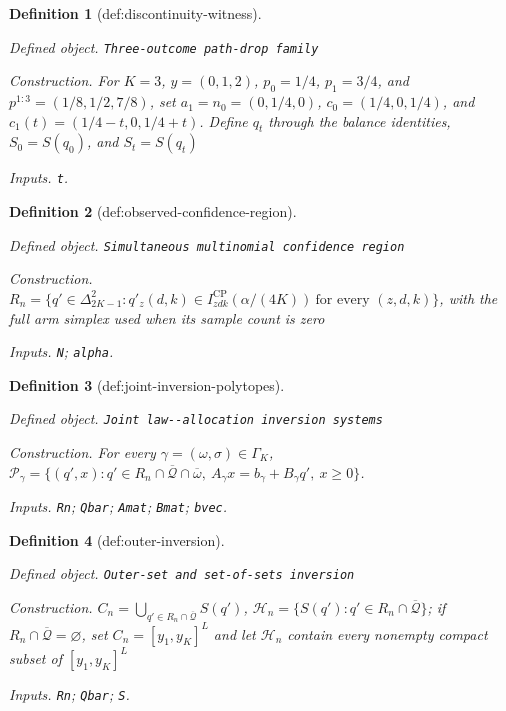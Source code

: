 \documentclass{article}
\newtheorem{definition}{Definition}
\begin{document}
\begin{definition}[def:discontinuity-witness]\label{def:discontinuity-witness}
\par\smallskip\noindent\emph{Defined object.} \texttt{Three-\allowbreak{}outcome path-\allowbreak{}drop family}
\par\smallskip\noindent\emph{Construction.} For \(K=3\), \(y=(0,1,2)\), \(p_0=1/4\), \(p_1=3/4\), and \(p^{1:3}=(1/8,1/2,7/8)\), set \(a_1=n_0=(0,1/4,0)\), \(c_0=(1/4,0,1/4)\), and \(c_1(t)=(1/4-t,0,1/4+t)\). Define \(q_t\) through the balance identities, \(S_0=S(q_0)\), and \(S_t=S(q_t)\)
\par\smallskip\noindent\emph{Inputs.} \texttt{t}.
\end{definition}

\begin{definition}[def:observed-confidence-region]\label{def:observed-confidence-region}
\par\smallskip\noindent\emph{Defined object.} \texttt{Simultaneous multinomial confidence region}
\par\smallskip\noindent\emph{Construction.} \(R_n=\{q'\in\Delta_{2K-1}^2:q'_z(d,k)\in I^{\mathrm{CP}}_{zdk}(\alpha/(4K))\ \text{for every }(z,d,k)\}\), with the full arm simplex used when its sample count is zero
\par\smallskip\noindent\emph{Inputs.} \texttt{N}; \texttt{alpha}.
\end{definition}

\begin{definition}[def:joint-inversion-polytopes]\label{def:joint-inversion-polytopes}
\par\smallskip\noindent\emph{Defined object.} \texttt{Joint law-\allowbreak{}-\allowbreak{}allocation inversion systems}
\par\smallskip\noindent\emph{Construction.} For every \(\gamma=(\omega,\sigma)\in\Gamma_K\), \(\mathcal P_\gamma=\{(q',x):q'\in R_n\cap\overline{\mathcal Q}\cap\overline\omega,\ A_\gamma x=b_\gamma+B_\gamma q',\ x\ge0\}\).
\par\smallskip\noindent\emph{Inputs.} \texttt{Rn}; \texttt{Qbar}; \texttt{Amat}; \texttt{Bmat}; \texttt{bvec}.
\end{definition}

\begin{definition}[def:outer-inversion]\label{def:outer-inversion}
\par\smallskip\noindent\emph{Defined object.} \texttt{Outer-\allowbreak{}set and set-\allowbreak{}of-\allowbreak{}sets inversion}
\par\smallskip\noindent\emph{Construction.} \(C_n=\bigcup_{q'\in R_n\cap\overline{\mathcal Q}}S(q')\), \(\mathcal H_n=\{S(q'):q'\in R_n\cap\overline{\mathcal Q}\}\); if \(R_n\cap\overline{\mathcal Q}=\varnothing\), set \(C_n=[y_1,y_K]^L\) and let \(\mathcal H_n\) contain every nonempty compact subset of \([y_1,y_K]^L\)
\par\smallskip\noindent\emph{Inputs.} \texttt{Rn}; \texttt{Qbar}; \texttt{S}.
\end{definition}
\end{document}
